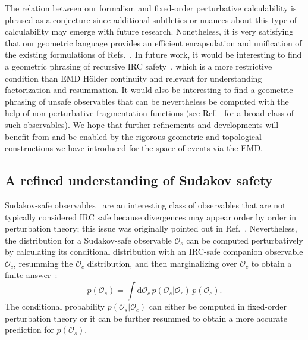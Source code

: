 \documentclass[letterpaper,11pt]{article}
\DeclareRobustCommand{\Ref}[1]{Ref.~\cite{#1}}
\DeclareRobustCommand{\Refs}[1]{Refs.~\cite{#1}}
\begin{document}
The relation between our formalism and fixed-order perturbative calculability is phrased as a conjecture since additional subtleties or nuances about this type of calculability may emerge with future research.
%
Nonetheless, it is very satisfying that our geometric language provides an efficient encapsulation and unification of the existing formulations of \Refs{Sterman:1979uw,Banfi:2004yd}.
%
In future work, it would be interesting to find a geometric phrasing of recursive IRC safety~\cite{Banfi:2004yd}, which is a more restrictive condition than EMD H\"older continuity and relevant for understanding factorization and resummation.
%
It would also be interesting to find a geometric phrasing of unsafe observables that can be nevertheless be computed with the help of non-perturbative fragmentation functions (see \Ref{Elder:2017bkd} for a broad class of such observables).
%
We hope that further refinements and developments will benefit from and be enabled by the rigorous geometric and topological constructions we have introduced for the space of events via the EMD.


\subsection{A refined understanding of Sudakov safety}


Sudakov-safe observables~\cite{Larkoski:2013paa,Larkoski:2014wba,Larkoski:2015lea} are an interesting class of observables that are not typically considered IRC safe because divergences may appear order by order in perturbation theory; this issue was originally pointed out in \Ref{Soyez:2012hv}.
%
Nevertheless, the distribution for a Sudakov-safe observable $\mathcal{O}_s$ can be computed perturbatively by calculating its conditional distribution with an IRC-safe companion observable $\mathcal{O}_c$, resumming the $\mathcal{O}_c$ distribution, and then marginalizing over $\mathcal{O}_c$ to obtain a finite answer~\cite{Larkoski:2015lea}:
%
\begin{equation}
\label{eq:sudakov_safe_strategy}
p(\mathcal{O}_s) = \int \text{d}\mathcal{O}_c \, p(\mathcal{O}_s | \mathcal{O}_c) \, p(\mathcal{O}_c).
\end{equation}
%
The conditional probability $p(\mathcal{O}_s | \mathcal{O}_c)$ can either be computed in fixed-order perturbation theory or it can be further resummed to obtain a more accurate prediction for $p(\mathcal{O}_s)$.
\end{document}
